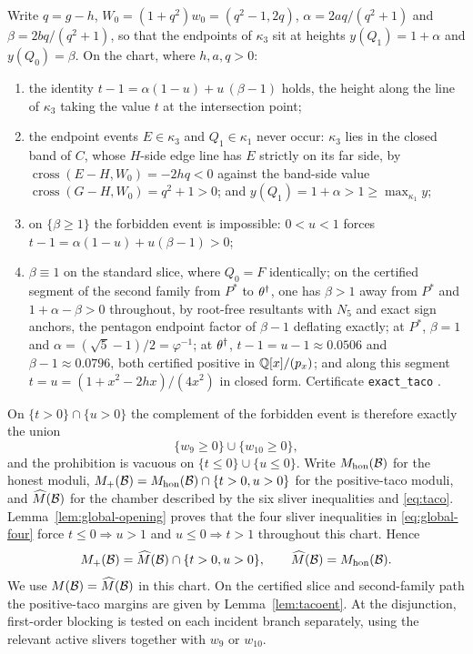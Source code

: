 \begin{lemma}\label{lem:tacoent}
Write $q=g-h$, $W_0=(1+q^2)w_0=(q^2-1,2q)$, $\alpha=2aq/(q^2+1)$ and $\beta=2bq/(q^2+1)$, so that the endpoints of $\kappa_3$ sit at heights $y(Q_1)=1+\alpha$ and $y(Q_0)=\beta$. On the chart, where $h,a,q>0$:
\begin{enumerate}
\item the identity $t-1=\alpha(1-u)+u\,(\beta-1)$ holds, the height along the line of $\kappa_3$ taking the value $t$ at the intersection point;
\item the endpoint events $E\in\kappa_3$ and $Q_1\in\kappa_1$ never occur: $\kappa_3$ lies in the closed band of $C$, whose $H$-side edge line has $E$ strictly on its far side, by $\operatorname{cross}(E-H,W_0)=-2hq<0$ against the band-side value $\operatorname{cross}(G-H,W_0)=q^2+1>0$; and $y(Q_1)=1+\alpha>1\ge\max_{\kappa_1}y$;
\item on $\{\beta\ge1\}$ the forbidden event is impossible: $0<u<1$ forces $t-1=\alpha(1-u)+u(\beta-1)>0$;
\item $\beta\equiv1$ on the standard slice, where $Q_0=F$ identically; on the certified segment of the second family from $P^*$ to $\theta^\dagger$, one has $\beta>1$ away from $P^*$ and $1+\alpha-\beta>0$ throughout, by root-free resultants with $N_5$ and exact sign anchors, the pentagon endpoint factor of $\beta-1$ deflating exactly; at $P^*$, $\beta=1$ and $\alpha=(\sqrt5-1)/2=\varphi^{-1}$; at $\theta^\dagger$, $t-1=u-1\approx0.0506$ and $\beta-1\approx0.0796$, both certified positive in $\mathbb{Q}[x]/(p_x)$; and along this segment $t=u=(1+x^2-2hx)/(4x^2)$ in closed form. Certificate \texttt{exact\_taco} \cite{anc}.
\end{enumerate}
\end{lemma}

On $\{t>0\}\cap\{u>0\}$ the complement of the forbidden event is therefore exactly the union
\begin{equation}\label{eq:taco}
  \{w_9\ge0\}\cup\{w_{10}\ge0\},
\end{equation}
and the prohibition is vacuous on $\{t\le0\}\cup\{u\le0\}$. Write $M_{\mathrm{hon}}(\mathcal{B})$ for the honest moduli, $M_{+}(\mathcal{B})=M_{\mathrm{hon}}(\mathcal{B})\cap\{t>0,u>0\}$ for the positive-taco moduli, and $\widehat{M}(\mathcal{B})$ for the chamber described by the six sliver inequalities and \eqref{eq:taco}. Lemma~\ref{lem:global-opening} proves that the four sliver inequalities in \eqref{eq:global-four} force $t\le0\Rightarrow u>1$ and $u\le0\Rightarrow t>1$ throughout this chart. Hence
\[M_{+}(\mathcal{B})=\widehat{M}(\mathcal{B})\cap\{t>0,u>0\},\qquad \widehat{M}(\mathcal{B})=M_{\mathrm{hon}}(\mathcal{B}).\]
We use $M(\mathcal{B})=\widehat{M}(\mathcal{B})$ in this chart. On the certified slice and second-family path the positive-taco margins are given by Lemma~\ref{lem:tacoent}. At the disjunction, first-order blocking is tested on each incident branch separately, using the relevant active slivers together with $w_9$ or $w_{10}$.

